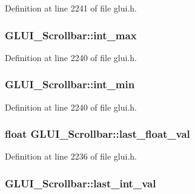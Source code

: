 Definition at line 2241 of file glui.\+h.

\hypertarget{class_g_l_u_i___scrollbar_af3438f0e574be6bf20478ef23ac630cf}{
\subsubsection[{int\+\_\+max}]{ G\+L\+U\+I\+\_\+\+Scrollbar\+::int\+\_\+max}}\label{class_g_l_u_i___scrollbar_af3438f0e574be6bf20478ef23ac630cf}


Definition at line 2240 of file glui.\+h.

\hypertarget{class_g_l_u_i___scrollbar_a984c4451659fe22bf37ef5f1059c45d2}{
\subsubsection[{int\+\_\+min}]{ G\+L\+U\+I\+\_\+\+Scrollbar\+::int\+\_\+min}}\label{class_g_l_u_i___scrollbar_a984c4451659fe22bf37ef5f1059c45d2}


Definition at line 2240 of file glui.\+h.

\hypertarget{class_g_l_u_i___scrollbar_ae4de8bd3b194d8cdf020b81ee7b89d9f}{
\subsubsection[{last\+\_\+float\+\_\+val}]{\setlength{\rightskip}{0pt plus 5cm}float G\+L\+U\+I\+\_\+\+Scrollbar\+::last\+\_\+float\+\_\+val}}\label{class_g_l_u_i___scrollbar_ae4de8bd3b194d8cdf020b81ee7b89d9f}


Definition at line 2236 of file glui.\+h.

\hypertarget{class_g_l_u_i___scrollbar_a0fdab119977f4ce65429287a140bc03a}{
\subsubsection[{last\+\_\+int\+\_\+val}]{ G\+L\+U\+I\+\_\+\+Scrollbar\+::last\+\_\+int\+\_\+val}}\label{class_g_l_u_i___scrollbar_a0fdab119977f4ce65429287a140bc03a}


